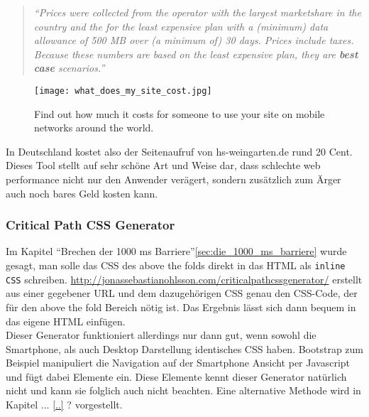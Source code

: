 			\begin{quote}
				\textit{"`Prices were collected from the operator with the largest marketshare in the country and the for the least expensive plan with a (minimum) data allowance of 500 MB over (a minimum of) 30 days. Prices include taxes. Because these numbers are based on the least expensive plan, they are \textbf{best case} scenarios."'}\autocite{siteCosts}
			\end{quote}

		\begin{figure}[htbp]
			\begin{center}
				\texttt{[image: what\_does\_my\_site\_cost.jpg]}
				\caption{Find out how much it costs for someone to use your site on mobile networks around the world.\autocite{siteCosts}}
				\label{fig:what_does_my_site_cost}
			\end{center}
		\end{figure}

		In Deutschland kostet also der Seitenaufruf von hs-weingarten.de rund 20 Cent. Dieses Tool stellt auf sehr schöne Art und Weise dar, dass schlechte web performance nicht nur den Anwender verägert, sondern zusätzlich zum Ärger auch noch bares Geld kosten kann.

		\subsubsection{Critical Path CSS Generator} %
		\label{ssub:critical_path_css_generator}
			Im Kapitel "`Brechen der 1000 ms Barriere"'\ref{sec:die_1000_ms_barriere} wurde gesagt, man solle das CSS des above the folds direkt in das HTML als \texttt{inline CSS} schreiben. \url{http://jonassebastianohlsson.com/criticalpathcssgenerator/} erstellt aus einer gegebener URL und dem dazugehörigen CSS genau den CSS-Code, der für den above the fold Bereich nötig ist. Das Ergebnis lässt sich dann bequem in das eigene HTML einfügen.\\

			Dieser Generator funktioniert allerdings nur dann gut, wenn sowohl die Smartphone, als auch Desktop Darstellung identisches CSS haben. Bootstrap zum Beispiel manipuliert die Navigation auf der Smartphone Ansicht per Javascript und fügt dabei Elemente ein. Diese Elemente kennt dieser Generator natürlich nicht und kann sie folglich auch nicht beachten. Eine alternative Methode wird in Kapitel ... \ref{..} ? vorgestellt.

